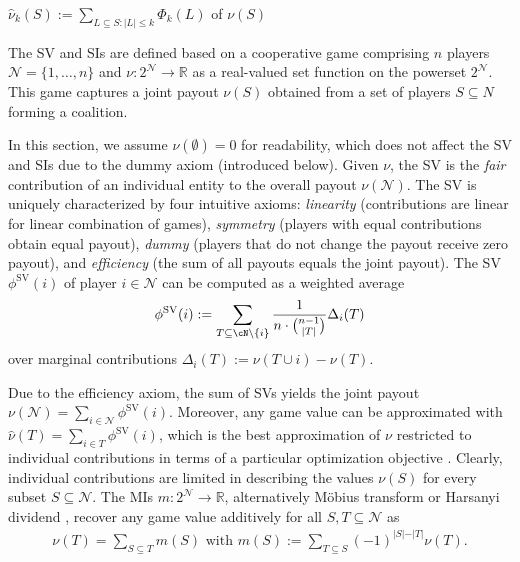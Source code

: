 
$\hat{\nu}_k(S) := \sum_{L \subseteq S:\vert L\vert \leq k}{\Phi_k(L)}$ of $\nu(S)$




The \gls*{SV} and \glspl*{SI} are defined based on a cooperative game comprising $n$ players $\mathcal{N} = \{1,\dots,n\}$ and $\nu: 2^{\mathcal{N}} \to \mathbb{R}$ as a real-valued set function on the powerset $2^{\mathcal N}$.
This game captures a joint payout $\nu(S)$ obtained from a set of players $S \subseteq N$ forming a coalition.


In this section, we assume $\nu(\emptyset)=0$ for readability, which does not affect the \gls*{SV} and \glspl*{SI} due to the dummy axiom (introduced below).
Given $\nu$, the \gls*{SV} \citep{Shapley.1953} is the \emph{fair} contribution of an individual entity to the overall payout $\nu(\mathcal{N})$.
The \gls*{SV} is uniquely characterized by four intuitive axioms: \emph{linearity} (contributions are linear for linear combination of games), \emph{symmetry} (players with equal contributions obtain equal payout), \emph{dummy} (players that do not change the payout receive zero payout), and \emph{efficiency} (the sum of all payouts equals the joint payout).
The \gls*{SV} $\phi^{\text{SV}}(i)$ of player $i \in \mathcal{N}$ can be computed as a weighted average
\[
    \phi^{\text{SV}}(i) := \sum_{T \subseteq \cN \setminus \{i\}} \frac{1}{n \cdot \binom{n-1}{\vert T \vert }} \Delta_i(T)\\ 
\]
over marginal contributions $\Delta_i(T) := \nu(T \cup i) - \nu(T)$.

Due to the efficiency axiom, the sum of \glspl*{SV} yields the joint payout $\nu(\mathcal{N}) = \sum_{i \in \mathcal{N}} \phi^{\text{SV}}(i)$.
Moreover, any game value can be approximated with $\hat\nu(T) = \sum_{i \in T} \phi^{\text{SV}}(i)$, which is the best approximation of $\nu$ restricted to individual contributions in terms of a particular optimization objective \citep{Charnes.1988}.
Clearly, individual contributions are limited in describing the values $\nu(S)$ for every subset $S \subseteq \mathcal{N}$.
The \glspl*{MI} $m: 2^{\mathcal N} \to \mathbb{R}$, alternatively Möbius 
transform \citep{rota1964foundations} or Harsanyi dividend \citep{harsanyi1963simplified}, recover any game value additively for all $S,T\subseteq \mathcal{N}$ as
\begin{align}\label{align_möbius_recovery}
    \nu(T) = \sum_{S \subseteq T} m(S) \text{ with } m(S) := \sum_{T \subseteq S} (-1)^{\vert S \vert -\vert T \vert} \nu(T) .
\end{align}

